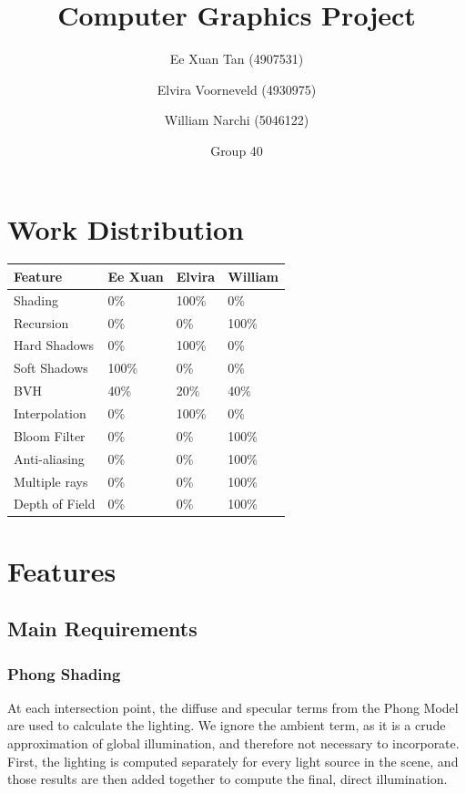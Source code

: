 \documentclass{article}
\author{Ee Xuan Tan (4907531) \and Elvira Voorneveld (4930975) \and William Narchi (5046122)}
\date{Group 40}
\title{Computer Graphics Project}
\begin{document}
    \maketitle

    \section{Work Distribution}
    \begin{tabular}{ |p{2.5cm}||p{2.5cm}|p{2.5cm}|p{2.5cm}| }
        \hline
        \textbf{Feature} &\textbf{Ee Xuan} &\textbf{Elvira} &\textbf{William}\\
        \hline
        Shading                        &0\%    &100\%  &0\%\\
        Recursion                      &0\%    &0\%    &100\%\\
        Hard Shadows                   &0\%    &100\%  &0\%\\
        Soft Shadows                   &100\%  &0\%    &0\%\\
        BVH                            &40\%   &20\%   &40\%\\
        Interpolation                  &0\%    &100\%  &0\%\\
        Bloom Filter                   &0\%    &0\%    &100\%\\
        Anti-aliasing                  &0\%    &0\%    &100\%\\
        Multiple rays                  &0\%    &0\%    &100\%\\
        Depth of Field                 &0\%    &0\%    &100\%\\
        \hline
    \end{tabular}

    \newpage

    \section{Features}
    \subsection{Main Requirements}
    \subsubsection{Phong Shading}
    At each intersection point, the diffuse and specular terms from the Phong Model are used to calculate the 
    lighting. We ignore the ambient term, as it is a crude approximation of global illumination, and therefore 
    not necessary to incorporate. First, the lighting is computed separately for every light source in the 
    scene, and those results are then added together to compute the final, direct illumination.
\end{document}
